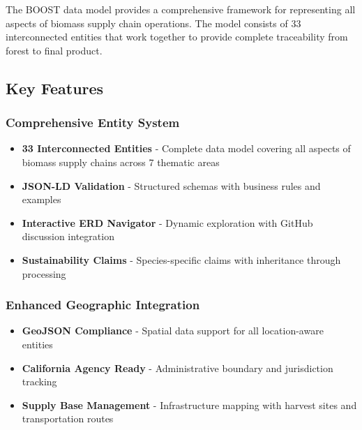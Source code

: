 
The BOOST data model provides a comprehensive framework for representing all aspects of biomass supply chain operations. The model consists of 33 interconnected entities that work together to provide complete traceability from forest to final product.

\subsection{Key Features}
\label{sec:data-model-features}

\subsubsection{Comprehensive Entity System}
\label{sec:comprehensive-entity-system}

\begin{important}[title=Complete Data Model Coverage]
\begin{itemize}
    \item \textbf{33 Interconnected Entities} - Complete data model covering all aspects of biomass supply chains across 7 thematic areas
    \item \textbf{JSON-LD Validation} - Structured schemas with business rules and examples  
    \item \textbf{Interactive ERD Navigator} - Dynamic exploration with GitHub discussion integration
    \item \textbf{Sustainability Claims} - Species-specific claims with inheritance through processing
\end{itemize}
\end{important}

\subsubsection{Enhanced Geographic Integration}
\label{sec:enhanced-geographic-integration}

\begin{informative}[title=Spatial Data Management]
\begin{itemize}
    \item \textbf{GeoJSON Compliance} - Spatial data support for all location-aware entities
    \item \textbf{California Agency Ready} - Administrative boundary and jurisdiction tracking
    \item \textbf{Supply Base Management} - Infrastructure mapping with harvest sites and transportation routes
\end{itemize}
\end{informative}

